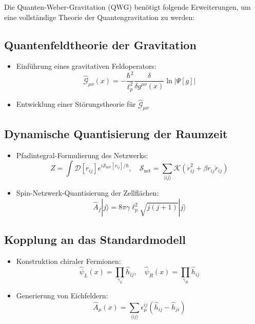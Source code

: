 Die Quanten-Weber-Gravitation (QWG) benötigt folgende Erweiterungen, um eine vollständige Theorie der Quantengravitation zu werden:

\subsection{Quantenfeldtheorie der Gravitation}
\begin{itemize}
    \item Einführung eines gravitativen Feldoperators:
    \begin{equation}
        \hat{\mathcal{G}}_{\mu\nu}(x) = -\frac{\hbar^2}{\ell_p^2} \frac{\delta}{\delta g^{\mu\nu}(x)} \ln|\Psi[g]|
    \end{equation}
    \item Entwicklung einer Störungstheorie für $\hat{\mathcal{G}}_{\mu\nu}$
\end{itemize}

\subsection{Dynamische Quantisierung der Raumzeit}
\begin{itemize}
    \item Pfadintegral-Formulierung des Netzwerks:
    \begin{equation}
        Z = \int \mathcal{D}[r_{ij}] e^{i\mathcal{S}_{\text{net}}[r_{ij}]/\hbar}, \quad \mathcal{S}_{\text{net}} = \sum_{\langle ij \rangle} \mathcal{K}\left(\dot{r}_{ij}^2 + \beta r_{ij}\ddot{r}_{ij}\right)
    \end{equation}
    \item Spin-Netzwerk-Quantisierung der Zellflächen:
    \begin{equation}
        \hat{A}_f|j\rangle = 8\pi\gamma\ell_p^2\sqrt{j(j+1)}|j\rangle
    \end{equation}
\end{itemize}

\subsection{Kopplung an das Standardmodell}
\begin{itemize}
    \item Konstruktion chiraler Fermionen:
    \begin{equation}
        \hat{\psi}_L(x) = \prod_{\gamma_L} \hat{h}_{ij}, \quad \hat{\psi}_R(x) = \prod_{\gamma_R} \hat{h}_{ij}
    \end{equation}
    \item Generierung von Eichfeldern:
    \begin{equation}
        \hat{A}_\mu(x) = \sum_{\langle ij \rangle} \epsilon_\mu^{ij}(\hat{h}_{ij} - \hat{h}_{ji})
    \end{equation}
\end{itemize}

